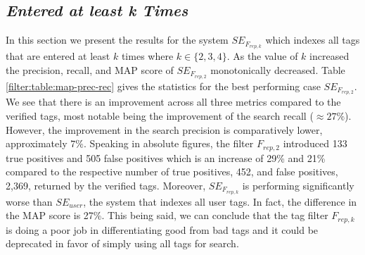 

\subsection{\textit{Entered at least \textbf{k} Times}}
In this section we present the results for the system $SE_{F_{rep,k}}$ which indexes all tags that are entered at least $k$ times where $k \in \{2,3,4\}$. As the value of $k$ increased the precision, recall, and MAP score of $SE_{F_{rep,2}}$ monotonically decreased. Table \ref{filter:table:map-prec-rec} gives the statistics for the best performing case $SE_{F_{rep,2}}$. We see that there is an improvement across all three metrics compared to the verified tags, most notable being the improvement of the search recall ($\approx 27\%$). However, the improvement in the search precision is comparatively lower, approximately $7\%$. Speaking in absolute figures, the filter $F_{rep,2}$ introduced 133 true positives and 505 false positives which is an increase of 29\% and 21\% compared to the respective number of true positives, 452, and false positives, 2,369, returned by the verified tags. Moreover, $SE_{F_{rep,k}}$ is performing significantly worse than $SE_{user}$, the system that indexes all user tags. In fact, the difference in the MAP score is 27\%. This being said, we can conclude that the tag filter $F_{rep,k}$ is doing a poor job in differentiating good from bad tags and it could be deprecated in favor of simply using all tags for search.

